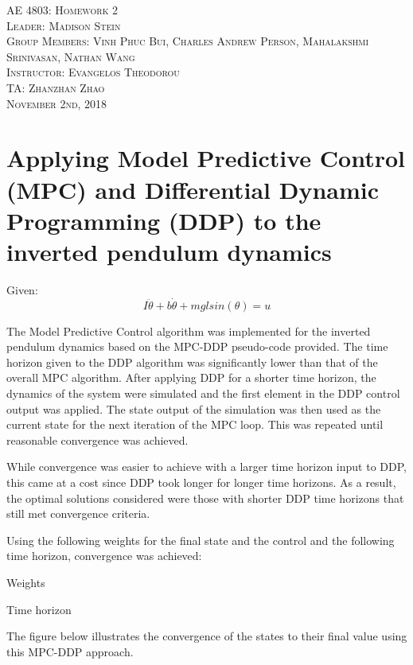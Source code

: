 \documentclass{article}
\begin{document}
\begin{titlepage}
    \center
    \textsc{\LARGE AE 4803: Homework 2}\\[1.5cm]
    \textsc{\Large Leader: Madison Stein}\\[0.5cm]
    \textsc{\Large Group Members: Vinh Phuc Bui, Charles Andrew Person, Mahalakshmi Srinivasan, Nathan Wang}\\[2cm]
    \textsc{\large Instructor: Evangelos Theodorou}\\[0.5cm]
    \textsc{\large TA: Zhanzhan Zhao}\\[1cm]
    \textsc{\large November 2nd, 2018}
\end{titlepage}

\section{Applying Model Predictive Control (MPC) and Differential Dynamic Programming (DDP) to the inverted pendulum dynamics}

Given:
\begin{equation}
I\ddot{\theta} + b\dot{\theta} + mglsin(\theta) = u
\end{equation}

The Model Predictive Control algorithm was implemented for the inverted pendulum dynamics based on the MPC-DDP pseudo-code provided. The time horizon given to the DDP algorithm was significantly lower than that of the overall MPC algorithm. After applying DDP for a shorter time horizon, the dynamics of the system were simulated and the first element in the DDP control output was applied. The state output of the simulation was then used as the current state for the next iteration of the MPC loop. This was repeated until reasonable convergence was achieved.


While convergence was easier to achieve with a larger time horizon input to DDP, this came at a cost since DDP took longer for longer time horizons. As a result, the optimal solutions considered were those with shorter DDP time horizons that still met convergence criteria.


Using the following weights for the final state and the control and the following time horizon, convergence was achieved:


Weights

Time horizon


The figure below illustrates the convergence of the states to their final value using this MPC-DDP approach.
\end{document}
